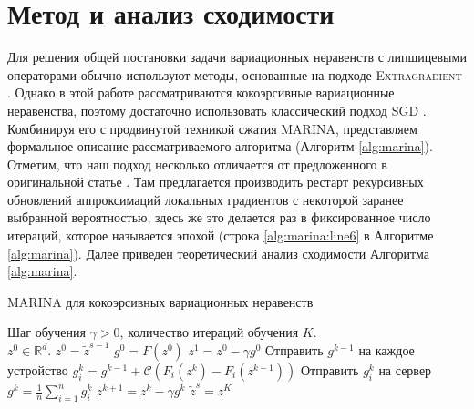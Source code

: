 \documentclass{ProcISPRAS}
\begin{document}
\section{Метод и анализ сходимости}

Для решения общей постановки задачи вариационных неравенств с липшицевыми операторами обычно используют методы, основанные на подходе \textsc{Extragradient} \cite{juditsky2011solving}. Однако в этой работе рассматриваются кокоэрсивные вариационные неравенства, поэтому достаточно использовать классический подход \textsc{SGD} \cite{robbins1951stochastic, moulines2011non}. Комбинируя его с продвинутой техникой сжатия \textsc{MARINA}, представляем формальное описание рассматриваемого алгоритма (Алгоритм \ref{alg:marina}). Отметим, что наш подход несколько отличается от предложенного в оригинальной статье \cite{gorbunov2021marina}. Там предлагается производить рестарт рекурсивных обновлений аппроксимаций локальных градиентов с некоторой заранее выбранной вероятностью, здесь же это делается раз в фиксированное число итераций, которое называется эпохой (строка \ref{alg:marina:line6} в Алгоритме \ref{alg:marina}).
Далее приведен теоретический анализ сходимости Алгоритма \ref{alg:marina}.

\begin{algorithm}[ht]
	\caption{\foreignlanguage{russian}{\textsc{MARINA} для кокоэрсивных вариационных неравенств}}
	\label{alg:marina}
	\begin{algorithmic}[1]
\State
{}  Шаг обучения $\gamma>0$, количество итераций обучения $K$.\\
 $z^0 \in \mathbb R^d$.
    \State $z^0 = \tilde z^{s-1}$
    \State $g^0 = F(z^0)$
    \State \label{alg:marina:line6}$z^1 = z^0 - \gamma g^0$
        \State Отправить $g^{k-1}$ на каждое устройство 
            \State $g_i^{k} = g^{k-1} + \mathcal{C}\left(F_i(z^{k}) - F_i(z^{k-1})\right)$
            \State Отправить $g_i^k$ на сервер
        \EndFor
        \State $g^k = \frac{1}{n}\sum\limits_{i=1}^n g_i^k$
        \State $z^{k+1} = z^k - \gamma g^k$
    \EndFor
    \State $\tilde z^s = z^K$
\EndFor

\end{algorithmic}
\end{algorithm}
\end{document}
